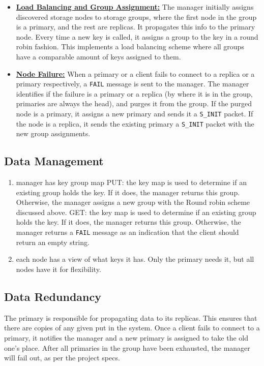 \documentclass{article}
\begin{document}
\begin{itemize}
    \item \textbf{\underline{Load Balancing and Group Assignment:}} The manager initially assigns discovered storage nodes to storage groups, where the first node in the group
    is a primary, and the rest are replicas. It propagates this info to the primary node. Every time a new key is called, it assigns a group to the key in a round robin fashion. 
    This implements a load balancing scheme where all groups have a comparable amount of keys assigned to them.
    \item \textbf{\underline{Node Failure:}} When a primary or a client fails to connect to a replica or a primary respectively, a \texttt{FAIL} message is sent to the manager. 
    The manager identifies if the failure is a primary or a replica (by where it is in the group, primaries are always the head), and purges it from the group. If the purged
    node is a primary, it assigns a new primary and sends it a \texttt{S\_INIT} packet. If the node is a replica, it sends the existing primary a \texttt{S\_INIT} packet with the 
    new group assignments. 
\end{itemize}

\subsection{Data Management}
\begin{enumerate}
    \item manager has key group map
        \subitem PUT: the key map is used to determine if an existing group holds the key. If it does, the manager returns this group. Otherwise, the manager assigns a new group
        with the Round robin scheme discussed above.
        \subitem GET: the key map is used to determine if an existing group holds the key. If it does, the manager returns this group. Otherwise, the manager returns a \texttt{FAIL}
        message as an indication that the client should return an empty string.
    \item each node has a view of what keys it has. Only the primary needs it, but all nodes have it for flexibility.
\end{enumerate}
\subsection{Data Redundancy}
The primary is responsible for propagating data to its replicas. This ensures that there are copies of any given put in the system. Once a client fails to connect to a primary,
it notifies the manager and a new primary is assigned to take the old one's place. After all primaries in the group have been exhausted, the manager will fail out, as per the project
specs. 
\end{document}
